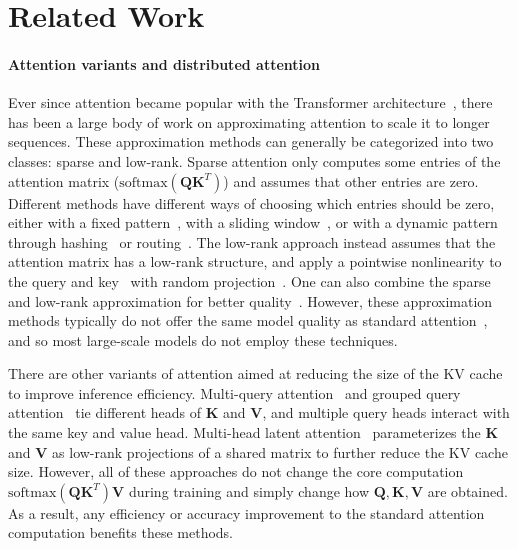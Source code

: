 \documentclass{article}
\newcommand{\vQ}{\mathbf{Q}}
\newcommand{\vK}{\mathbf{K}}
\newcommand{\vV}{\mathbf{V}}
\begin{document}
\section{Related Work}
\label{sec:related_work}

\paragraph{Attention variants and distributed attention}
Ever since attention became popular with the Transformer
architecture~\citep{vaswani2017attention}, there has been a large body of work
on approximating attention to scale it to longer sequences.
These approximation methods can generally be categorized into two classes:
sparse and low-rank.
Sparse attention only computes some entries of the attention matrix ($\mathrm{softmax}(\vQ
\vK^T)$) and assumes that other entries are zero.
Different methods have different ways of choosing which entries should be zero,
either with a fixed pattern~\citep{child2019generating}, with a sliding
window~\citep{beltagy2020longformer}, or with a dynamic pattern through
hashing~\citep{kitaev2020reformer} or routing~\citep{roy2020efficient}.
The low-rank approach instead assumes that the attention matrix has a low-rank
structure, and apply a pointwise nonlinearity to the query and
key~\citep{katharopoulos2020transformers} with random
projection~\citep{choromanski2021rethinking, peng2021random, xiong2021nystromformer}.
One can also combine the sparse and low-rank approximation for better
quality~\citep{zaheer2020bigbird,scatterbrain}.
However, these approximation methods typically do not offer the same model
quality as standard attention~\citep{tay2020efficient}, and so most large-scale
models do not employ these techniques.

There are other variants of attention aimed at reducing the size of the KV cache
to improve inference efficiency. Multi-query attention~\citep{shazeer2019fast} and grouped query
attention~\citep{ainslie2023gqa} tie different heads of $\vK$ and $\vV$, and
multiple query heads interact with the same key and value head.
Multi-head latent attention~\citep{deepseekv2} parameterizes the $\vK$ and $\vV$
as low-rank projections of a shared matrix to further reduce the KV cache size.
However, all of these approaches do not change the core computation
$\mathrm{softmax}(\vQ \vK^T) \vV$ during training and simply change how $\vQ, \vK, \vV$ are
obtained.
As a result, any efficiency or accuracy improvement to the standard attention
computation benefits these methods.
\end{document}
